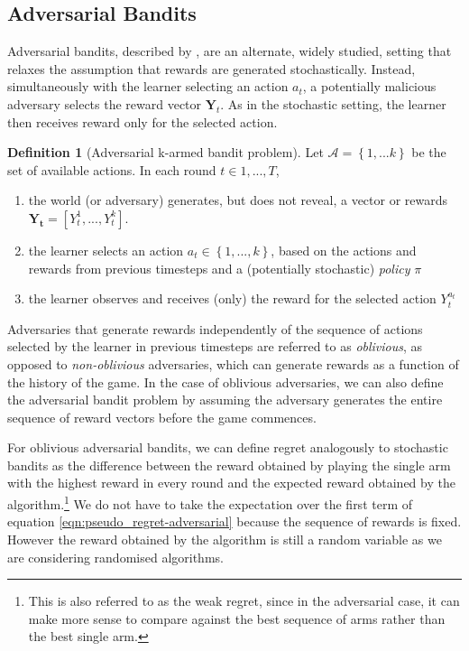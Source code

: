 \documentclass[11pt,a4paper,twoside]{report}
\newcommand{\actionspace}{\mathcal{A}}
\newcommand{\set}[1]{\left\{#1\right\}}
\newcommand{\cfb}[2]{{#1}_t^{#2}} %
\renewcommand{\vec}[1]{\boldsymbol{#1}}
\theoremstyle{plain}
\theoremstyle{definition}
\newtheorem{definition}[theorem]{Definition}
\begin{document}
\subsection{Adversarial Bandits}
\label{sec:adversarial-bandits}

Adversarial bandits, described by \citet{Auer1995}, are an alternate, widely studied, setting that relaxes the assumption that rewards are generated stochastically. Instead, simultaneously with the learner selecting an action $a_t$, a potentially malicious adversary selects the reward vector $\boldsymbol{Y}_t$. As in the stochastic setting, the learner then receives reward only for the selected action. 

\vspace{0.5cm}
\begin{definition}[Adversarial k-armed bandit problem]
\label{def:adversarial-k-armed-bandit}
Let $\actionspace = \set{1,...k}$ be the set of available actions.  In each round $t \in 1,...,T$, 
\begin{enumerate}
\item the world (or adversary) generates, but does not reveal, a vector or rewards $\vec{Y_t}=[\cfb{Y}{1},...,\cfb{Y}{k}]$. 
\item the learner selects an action $a_{t} \in \set{1,...,k}$, based on the actions and rewards from previous timesteps and a (potentially stochastic) \emph{policy} $\pi$
\item the learner observes and receives (only) the reward for the selected action $\cfb{Y}{a_t}$ 
\end{enumerate} 
\end{definition}

Adversaries that generate rewards independently of the sequence of actions selected by the learner in previous timesteps are referred to as \emph{oblivious}, as opposed to \emph{non-oblivious} adversaries, which can generate rewards as a function of the history of the game. In the case of oblivious adversaries, we can also define the adversarial bandit problem by assuming the adversary generates the entire sequence of reward vectors before the game commences. 

For oblivious adversarial bandits, we can define regret analogously to stochastic bandits as the difference between the reward obtained by playing the single arm with the highest reward in every round and the expected reward obtained by the algorithm.\footnote{This is also referred to as the weak regret, since in the adversarial case, it can make more sense to compare against the best sequence of arms rather than the best single arm.} We do not have to take the expectation over the first term of equation \ref{eqn:pseudo_regret-adversarial} because the sequence of rewards is fixed. However the reward obtained by the algorithm is still a random variable as we are considering randomised algorithms.  
\end{document}
